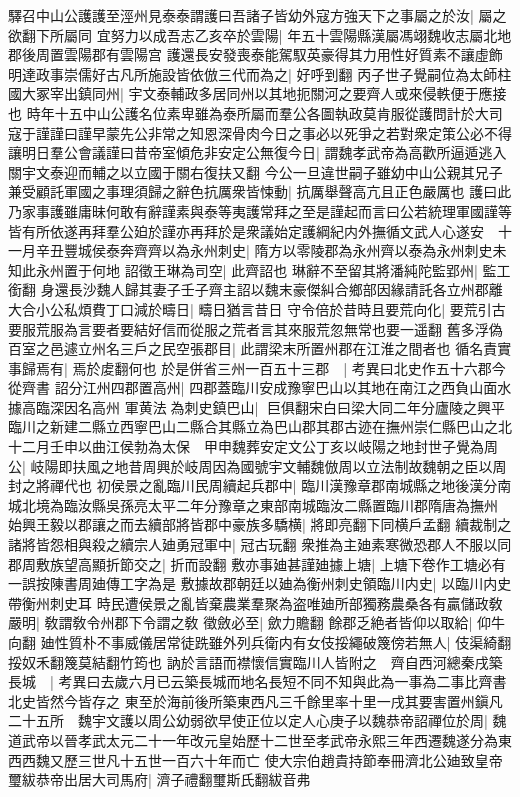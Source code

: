 驛召中山公護護至涇州見泰泰謂護曰吾諸子皆幼外寇方強天下之事屬之於汝|{
	屬之欲翻下所屬同}
宜努力以成吾志乙亥卒於雲陽|{
	年五十雲陽縣漢屬馮翊魏收志屬北地郡後周置雲陽郡有雲陽宫}
護還長安發喪泰能駕馭英豪得其力用性好質素不讓虛飾明達政事崇儒好古凡所施設皆依倣三代而為之|{
	好呼到翻}
丙子世子覺嗣位為太師柱國大冢宰出鎮同州|{
	宇文泰輔政多居同州以其地扼關河之要齊人或來侵軼便于應接也}
時年十五中山公護名位素卑雖為泰所屬而羣公各圖執政莫肯服從護問計於大司寇于謹謹曰謹早蒙先公非常之知恩深骨肉今日之事必以死爭之若對衆定策公必不得讓明日羣公會議謹曰昔帝室傾危非安定公無復今日|{
	謂魏孝武帝為高歡所逼遁逃入關宇文泰迎而輔之以立國于關右復扶又翻}
今公一旦違世嗣子雖幼中山公親其兄子兼受顧託軍國之事理須歸之辭色抗厲衆皆悚動|{
	抗厲舉聲高亢且正色嚴厲也}
護曰此乃家事護雖庸昧何敢有辭謹素與泰等夷護常拜之至是謹起而言曰公若統理軍國謹等皆有所依遂再拜羣公廹於謹亦再拜於是衆議始定護綱紀内外撫循文武人心遂安　十一月辛丑豐城侯泰奔齊齊以為永州刺史|{
	隋方以零陵郡為永州齊以泰為永州刺史未知此永州置于何地}
詔徵王琳為司空|{
	此齊詔也}
琳辭不至留其將潘純陀監郢州|{
	監工銜翻}
身還長沙魏人歸其妻子壬子齊主詔以魏末豪傑糾合鄉部因緣請託各立州郡離大合小公私煩費丁口減於疇日|{
	疇日猶言昔日}
守令倍於昔時且要荒向化|{
	要荒引古要服荒服為言要者要結好信而從服之荒者言其來服荒忽無常也要一遥翻}
舊多浮偽百室之邑遽立州名三戶之民空張郡目|{
	此謂梁末所置州郡在江淮之間者也}
循名責實事歸焉有|{
	焉於䖍翻何也}
於是併省三州一百五十三郡　|{
	考異曰北史作五十六郡今從齊書}
詔分江州四郡置高州|{
	四郡蓋臨川安成豫寧巴山以其地在南江之西負山面水據高臨深因名高州}
軍黄法為刺史鎮巴山|{
	巨俱翻宋白曰梁大同二年分廬陵之興平臨川之新建二縣立西寧巴山二縣合其縣立為巴山郡其郡古迹在撫州崇仁縣巴山之北}
十二月壬申以曲江侯勃為太保　甲申魏葬安定文公丁亥以岐陽之地封世子覺為周公|{
	岐陽即扶風之地昔周興於岐周因為國號宇文輔魏倣周以立法制故魏朝之臣以周封之將禪代也}
初侯景之亂臨川民周續起兵郡中|{
	臨川漢豫章郡南城縣之地後漢分南城北境為臨汝縣吳孫亮太平二年分豫章之東部南城臨汝二縣置臨川郡隋唐為撫州}
始興王毅以郡讓之而去續部將皆郡中豪族多驕横|{
	將即亮翻下同横戶孟翻}
續裁制之諸將皆怨相與殺之續宗人廸勇冠軍中|{
	冠古玩翻}
衆推為主廸素寒微恐郡人不服以同郡周敷族望高顯折節交之|{
	折而設翻}
敷亦事廸甚謹廸據上塘|{
	上塘下卷作工塘必有一誤按陳書周廸傳工字為是}
敷據故郡朝廷以廸為衡州刺史領臨川内史|{
	以臨川内史帶衡州刺史耳}
時民遭侯景之亂皆棄農業羣聚為盗唯廸所部獨務農桑各有贏儲政敎嚴明|{
	敎謂敎令州郡下令謂之敎}
徵斂必至|{
	歛力贍翻}
餘郡乏絶者皆仰以取給|{
	仰牛向翻}
廸性質朴不事威儀居常徒跣雖外列兵衛内有女伎挼繩破篾傍若無人|{
	伎渠綺翻挼奴禾翻篾莫結翻竹筠也}
訥於言語而襟懷信實臨川人皆附之　齊自西河總秦戌築長城　|{
	考異曰去歲六月已云築長城而地名長短不同不知與此為一事為二事比齊書北史皆然今皆存之}
東至於海前後所築東西凡三千餘里率十里一戌其要害置州鎭凡二十五所　魏宇文護以周公幼弱欲早使正位以定人心庚子以魏恭帝詔禪位於周|{
	魏道武帝以晉孝武太元二十一年改元皇始歷十二世至孝武帝永熙三年西遷魏遂分為東西西魏又歷三世凡十五世一百六十年而亡}
使大宗伯趙貴持節奉冊濟北公廸致皇帝璽紱恭帝出居大司馬府|{
	濟子禮翻璽斯氏翻紱音弗}


